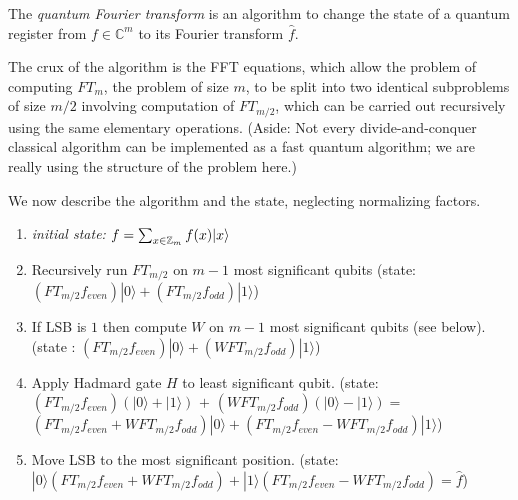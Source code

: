 The \emph{quantum Fourier transform} is an algorithm to change the state
of a quantum register from \(f \in \mathbb{C}^m\) to its Fourier
transform \(\hat{f}\).

\hypertarget{quantumftthm}{}

The crux of the algorithm is the FFT equations, which allow the problem
of computing \(\ensuremath{\mathit{FT}}_m\), the problem of size \(m\),
to be split into two identical subproblems of size \(m/2\) involving
computation of \(\ensuremath{\mathit{FT}}_{m/2}\), which can be carried
out recursively using the same elementary operations. (Aside: Not every
divide-and-conquer classical algorithm can be implemented as a fast
quantum algorithm; we are really using the structure of the problem
here.)

We now describe the algorithm and the state, neglecting normalizing
factors.

\begin{enumerate}
\def\labelenumi{\arabic{enumi}.}
\item
  \emph{initial state:} \(f= \sum_{x\in{\mathbb{Z}}_m} f(x)|x\rangle\)
\item
  Recursively run \(\ensuremath{\mathit{FT}}_{m/2}\) on \(m-1\) most
  significant qubits (state:
  \((\ensuremath{\mathit{FT}}_{m/2}f_{even})|0\rangle + (\ensuremath{\mathit{FT}}_{m/2}f_{odd})|1\rangle\))
\item
  If LSB is \(1\) then compute \(W\) on \(m-1\) most significant qubits
  (see below). (state :
  \((\ensuremath{\mathit{FT}}_{m/2}f_{even})|0\rangle + (W \ensuremath{\mathit{FT}}_{m/2}f_{odd})|1\rangle\))
\item
  Apply Hadmard gate \(H\) to least significant qubit. (state:
  \((\ensuremath{\mathit{FT}}_{m/2}f_{even})(|0\rangle+|1\rangle)\)
  \(+\)
  \((W \ensuremath{\mathit{FT}}_{m/2}f_{odd})(|0\rangle-|1\rangle) =\)
  \((\ensuremath{\mathit{FT}}_{m/2}f_{even}+ W \ensuremath{\mathit{FT}}_{m/2}f_{odd})|0\rangle + (\ensuremath{\mathit{FT}}_{m/2}f_{even}-W \ensuremath{\mathit{FT}}_{m/2}f_{odd})|1\rangle\))
\item
  Move LSB to the most significant position. (state:
  \(|0\rangle(\ensuremath{\mathit{FT}}_{m/2}f_{even}+ W \ensuremath{\mathit{FT}}_{m/2}f_{odd}) + |1\rangle(\ensuremath{\mathit{FT}}_{m/2}f_{even}- W \ensuremath{\mathit{FT}}_{m/2}f_{odd}) = \hat{f}\))
\end{enumerate}

